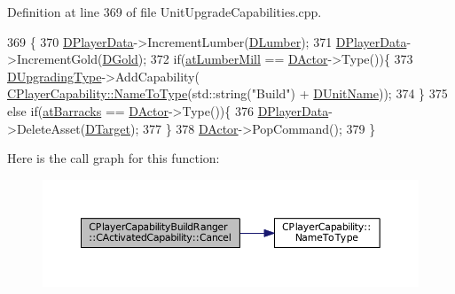 Definition at line 369 of file Unit\+Upgrade\+Capabilities.\+cpp.


\begin{DoxyCode}
369                                                              \{
370     \hyperlink{classCActivatedPlayerCapability_a9bf27c322a73f4b11c8183cc1973c3d8}{DPlayerData}->IncrementLumber(\hyperlink{classCPlayerCapabilityBuildRanger_1_1CActivatedCapability_a149028982faf1d393580d5d57bf4da03}{DLumber});
371     \hyperlink{classCActivatedPlayerCapability_a9bf27c322a73f4b11c8183cc1973c3d8}{DPlayerData}->IncrementGold(\hyperlink{classCPlayerCapabilityBuildRanger_1_1CActivatedCapability_a1943b07bf35da2a475fd1bb36ca777ab}{DGold});
372     \textcolor{keywordflow}{if}(\hyperlink{GameDataTypes_8h_a5600d4fc433b83300308921974477feca7bb38316bc3193b5c9ec67ea6aad549c}{atLumberMill} == \hyperlink{classCActivatedPlayerCapability_a54ca944b47bff2718330639941d402b0}{DActor}->Type())\{
373         \hyperlink{classCPlayerCapabilityBuildRanger_1_1CActivatedCapability_a86cf7894dce398e7c5f4642e57e31682}{DUpgradingType}->AddCapability(
      \hyperlink{classCPlayerCapability_a920a696526e8a839f728192aea0ba1c5}{CPlayerCapability::NameToType}(std::string(\textcolor{stringliteral}{"Build"}) + 
      \hyperlink{classCPlayerCapabilityBuildRanger_1_1CActivatedCapability_a0914856622c9b77b9943add2491c97be}{DUnitName}));
374     \}
375     \textcolor{keywordflow}{else} \textcolor{keywordflow}{if}(\hyperlink{GameDataTypes_8h_a5600d4fc433b83300308921974477feca1cbf6c944f30d615a247eef1f57b2230}{atBarracks} == \hyperlink{classCActivatedPlayerCapability_a54ca944b47bff2718330639941d402b0}{DActor}->Type())\{
376         \hyperlink{classCActivatedPlayerCapability_a9bf27c322a73f4b11c8183cc1973c3d8}{DPlayerData}->DeleteAsset(\hyperlink{classCActivatedPlayerCapability_a8a1cf50b6501bcfd55af0c935828e395}{DTarget});
377     \}
378     \hyperlink{classCActivatedPlayerCapability_a54ca944b47bff2718330639941d402b0}{DActor}->PopCommand();
379 \}
\end{DoxyCode}
Here is the call graph for this function\+:
\nopagebreak
\begin{figure}[H]
\begin{center}
\leavevmode
\includegraphics[width=350pt]{classCPlayerCapabilityBuildRanger_1_1CActivatedCapability_a46a5240502d6a8de65d3d56bbda8bf91_cgraph}
\end{center}
\end{figure}
\hypertarget{classCPlayerCapabilityBuildRanger_1_1CActivatedCapability_a5fd10074c6b25ffb36401055ed90b70b}{}\label{classCPlayerCapabilityBuildRanger_1_1CActivatedCapability_a5fd10074c6b25ffb36401055ed90b70b} 
